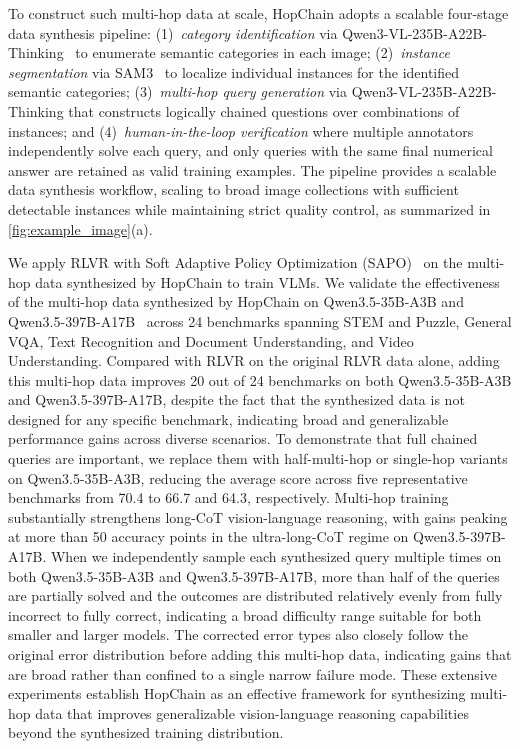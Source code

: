 To construct such multi-hop data at scale, HopChain adopts a scalable four-stage data synthesis pipeline:
(1)~\emph{category identification} via Qwen3-VL-235B-A22B-Thinking~ to enumerate semantic categories in each image;
(2)~\emph{instance segmentation} via SAM3~ to localize individual instances for the identified semantic categories;
(3)~\emph{multi-hop query generation} via Qwen3-VL-235B-A22B-Thinking that constructs logically chained questions over combinations of instances; and
(4)~\emph{human-in-the-loop verification} where multiple annotators independently solve each query, and only queries with the same final numerical answer are retained as valid training examples.
The pipeline provides a scalable data synthesis workflow, scaling to broad image collections with sufficient detectable instances while maintaining strict quality control, as summarized in \cref{fig:example_image}(a).

We apply RLVR with Soft Adaptive Policy Optimization (SAPO)~ on the multi-hop data synthesized by HopChain to train VLMs.
We validate the effectiveness of the multi-hop data synthesized by HopChain on Qwen3.5-35B-A3B and Qwen3.5-397B-A17B~ across 24 benchmarks spanning STEM and Puzzle, General VQA, Text Recognition and Document Understanding, and Video Understanding.
Compared with RLVR on the original RLVR data alone, adding this multi-hop data improves 20 out of 24 benchmarks on both Qwen3.5-35B-A3B and Qwen3.5-397B-A17B, despite the fact that the synthesized data is not designed for any specific benchmark, indicating broad and generalizable performance gains across diverse scenarios.
To demonstrate that full chained queries are important, we replace them with half-multi-hop or single-hop variants on Qwen3.5-35B-A3B, reducing the average score across five representative benchmarks from 70.4 to 66.7 and 64.3, respectively.
Multi-hop training substantially strengthens long-CoT vision-language reasoning, with gains peaking at more than 50 accuracy points in the ultra-long-CoT regime on Qwen3.5-397B-A17B.
When we independently sample each synthesized query multiple times on both Qwen3.5-35B-A3B and Qwen3.5-397B-A17B, more than half of the queries are partially solved and the outcomes are distributed relatively evenly from fully incorrect to fully correct, indicating a broad difficulty range suitable for both smaller and larger models. The corrected error types also closely follow the original error distribution before adding this multi-hop data, indicating gains that are broad rather than confined to a single narrow failure mode.
These extensive experiments establish HopChain as an effective framework for synthesizing multi-hop data that improves generalizable vision-language reasoning capabilities beyond the synthesized training distribution.

